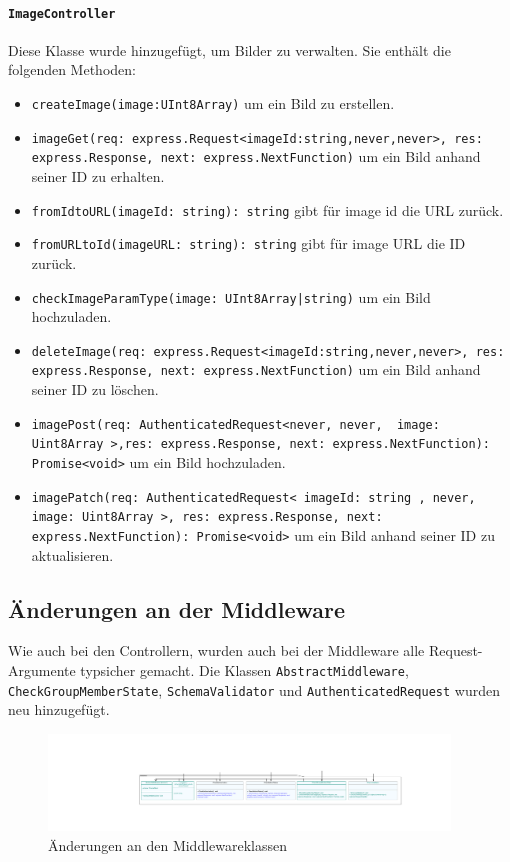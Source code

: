 \documentclass{implementierungsheft}
\begin{document}
\paragraph{\texttt{ImageController}} Diese Klasse wurde hinzugefügt, um Bilder zu verwalten. Sie enthält die folgenden Methoden:
\begin{itemize}
    \item \texttt{createImage(image:UInt8Array)} um ein Bild zu erstellen.
    \item \texttt{imageGet(req: express.Request<{imageId:string},never,never>, res: express.Response, next: express.NextFunction)} um ein Bild anhand seiner ID zu erhalten.
    \item \texttt{fromIdtoURL(imageId: string): string} gibt für image id die URL zurück.
    \item \texttt{fromURLtoId(imageURL: string): string} gibt für image URL die ID zurück.
    \item \texttt{checkImageParamType(image: UInt8Array|string)} um ein Bild hochzuladen.
    \item \texttt{deleteImage(req: express.Request<{imageId:string},never,never>, res: express.Response, next: express.NextFunction)} um ein Bild anhand seiner ID zu löschen.
    \item \texttt{imagePost(req: AuthenticatedRequest<never, never, { image: Uint8Array }>,res: express.Response, next: express.NextFunction): Promise<void>} um ein Bild hochzuladen.
    \item \texttt{imagePatch(req: AuthenticatedRequest<{ imageId: string }, never, { image: Uint8Array }>, res: express.Response, next: express.NextFunction): Promise<void>} um ein Bild anhand seiner ID zu aktualisieren.
\end{itemize}

\subsection{Änderungen an der Middleware} Wie auch bei den Controllern, wurden auch bei der Middleware alle Request-Argumente typsicher gemacht. Die Klassen \texttt{AbstractMiddleware}, \texttt{CheckGroupMemberState}, \texttt{SchemaValidator} und \texttt{AuthenticatedRequest} wurden neu hinzugefügt.


\begin{figure}[htp]
    \centering
    \includegraphics[width=0.95\textwidth]{images/uml/middleware.pdf}
    \caption{Änderungen an den Middlewareklassen}
    \label{fig:middleware}
\end{figure}
\end{document}
